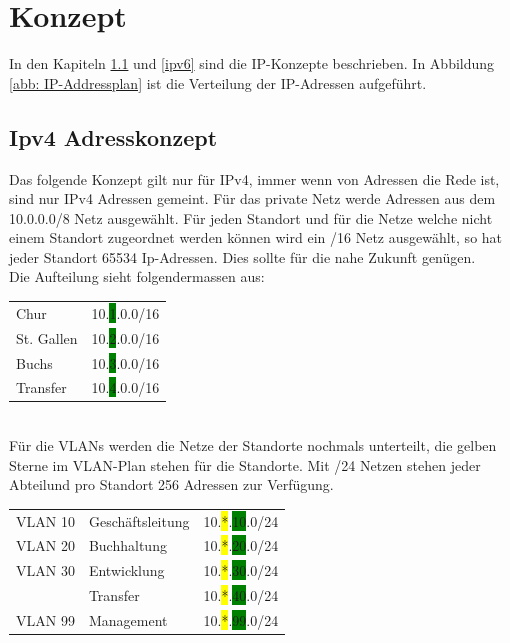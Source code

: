 \documentclass[11pt,a4paper]{scrreprt}
\begin{document}
\chapter{Konzept}
In den Kapiteln \ref{ipv4} und \ref{ipv6} sind die IP-Konzepte beschrieben. In Abbildung \ref{abb: IP-Addressplan} ist die Verteilung der IP-Adressen aufgeführt.
\section{Ipv4 Adresskonzept} \label{ipv4}
Das folgende Konzept gilt nur für IPv4, immer wenn von Adressen die Rede ist, sind nur IPv4 Adressen gemeint.
Für das private Netz werde Adressen aus dem 10.0.0.0/8 Netz ausgewählt. Für jeden Standort und für die Netze welche nicht einem Standort zugeordnet werden können wird ein /16 Netz ausgewählt, so hat jeder Standort 65534 Ip-Adressen. Dies sollte für die nahe Zukunft genügen.\\
\newline
Die Aufteilung sieht folgendermassen aus: \\
\newline
\hspace*{1cm} 
\begin{tabular}{ll}
    Chur & 10.\colorbox{green}{1}.0.0/16\\
    St. Gallen & 10.\colorbox{green}{2}.0.0/16\\
    Buchs & 10.\colorbox{green}{3}.0.0/16\\
    Transfer & 10.\colorbox{green}{4}.0.0/16\\
\end{tabular}\\
\newline
Für die \acs{VLAN}s werden die Netze der Standorte nochmals unterteilt, die gelben Sterne im \acs{VLAN}-Plan stehen für die Standorte. Mit /24 Netzen stehen jeder Abteilund pro Standort 256 Adressen zur Verfügung.\\
\newline
\hspace*{1cm} 
\begin{tabular}{lll}
     \acs{VLAN} 10 & Geschäftsleitung & 10.\colorbox{yellow}{*}.\colorbox{green}{10}.0/24\\
     \acs{VLAN} 20 & Buchhaltung & 10.\colorbox{yellow}{*}.\colorbox{green}{20}.0/24\\
     \acs{VLAN} 30 & Entwicklung & 10.\colorbox{yellow}{*}.\colorbox{green}{30}.0/24\\
             & Transfer & 10.\colorbox{yellow}{*}.\colorbox{green}{40}.0/24\\
     \acs{VLAN} 99 & Management & 10.\colorbox{yellow}{*}.\colorbox{green}{99}.0/24\\
\end{tabular}
\newpage
\end{document}
